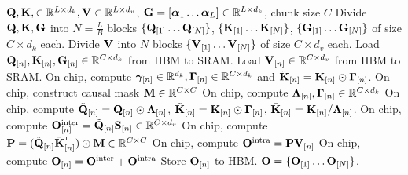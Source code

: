 \begin{algorithm}[b!]
\small
\caption{Forward pass for gated linear attention (w/o. materialization)}
\label{algo:gla-chunk-scan-2-fwd}
\begin{algorithmic}
    \Require ${\mathbf{Q}}, {\mathbf{K}}, \in \mathbb{R}^{L \times d_k}, {\mathbf{V}}  \in \mathbb{R}^{L \times d_v}$, ${\mathbf{G}} =[{\bm{\alpha}}_1 \dots {\bm{\alpha}}_L] \in \mathbb{R}^{L \times d_k}$, chunk size $C$
    \State Divide ${\mathbf{Q}}, {\mathbf{K}}, {\mathbf{G}}$ into $N = \frac{L}{B}$ blocks $\{ {\mathbf{Q}}_{[1]} \dots {\mathbf{Q}}_{[N]} \} $, $\{ {\mathbf{K}}_{[1]} \dots {\mathbf{K}}_{[N]} \}$, $\{ {\mathbf{G}}_{[1]} \dots {\mathbf{G}}_{[N]} \} $ of size $C \times d_k$ each.
    \State Divide ${\mathbf{V}}$ into $N$ blocks $\{ {\mathbf{V}}_{[1]} \dots {\mathbf{V}}_{[N]} \}$ of size $C \times d_v$ each.
        \State Load ${\mathbf{Q}}_{[n]}, {\mathbf{K}}_{[n]}, {\mathbf{G}}_{[n]} \in \mathbb{R}^{C \times d_k}$ from HBM to SRAM.
        \State Load ${\mathbf{V}}_{[n]}  \in \mathbb{R}^{C \times d_v}$ from HBM to SRAM.
        \State On chip, compute ${\bm{\gamma}}_{[n]} \in \mathbb{R}^{d_k}, {\mathbf{\Gamma}}_{[n]} \in \mathbb{R}^{C \times d_k}$ and $\tilde {{\mathbf{K}}}_{[n]} = {\mathbf{K}}_{[n]} \odot {\mathbf{\Gamma}}_{[n]}$. %
        \State On chip, construct causal mask ${\mathbf{M}}\in \mathbb{R}^{C\times C}$ %
        \State On chip, compute ${\mathbf{\Lambda}}_{[n]}, {\mathbf{\Gamma}}_{[n]} \in \mathbb{R}^{C \times d_k}$
        \State On chip, compute $\tilde {{\mathbf{Q}}}_{[n]} = {\mathbf{Q}}_{[n]} \odot {\mathbf{\Lambda}}_{[n]}$, $\tilde {{\mathbf{K}}}_{[n]} = {\mathbf{K}}_{[n]} \odot {\mathbf{\Gamma}}_{[n]}$, $\bar {{\mathbf{K}}}_{[n]} = {\mathbf{K}}_{[n]} / {\mathbf{\Lambda}}_{[n]}$.
        \State On chip, compute ${\mathbf{O}}_{[n]}^{\text{inter}} = \tilde {{\mathbf{Q}}}_{[n]} {\mathbf{S}}_{[n]} \in \mathbb{R}^{C \times d_v}$
        \State On chip, compute $\rmP = (\tilde \rmQ_{[n]} \bar \rmK^\intercal_{[n]})\odot \rmM  \in \R^{C \times C} $
        \State On chip, compute ${\mathbf{O}}^{\text{intra}} = {\mathbf{P}} {\mathbf{V}}_{[n]} $
        \State On chip, compute $ {\mathbf{O}}_{[n]} = {\mathbf{O}}^{\text{inter}} + {\mathbf{O}}^{\text{intra}} $
        \State Store ${\mathbf{O}}_{[n]}$ to HBM.
   \EndFor
  \State \Return ${\mathbf{O}} = \{ {\mathbf{O}}_{[1]} \dots {\mathbf{O}}_{[N]} \}$.
\end{algorithmic}
\end{algorithm}

